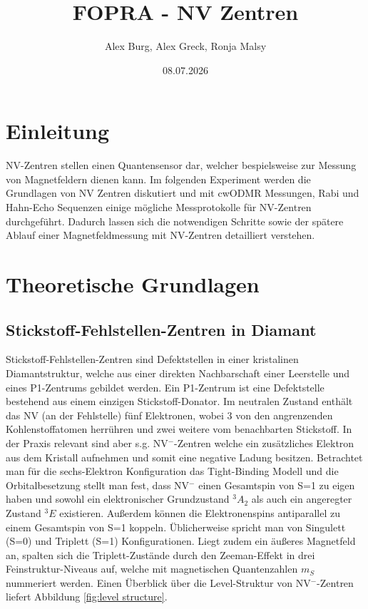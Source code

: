 \documentclass[12pt, a4paper]{article}
\title{FOPRA - NV Zentren}
\author{Alex Burg, Alex Greck, Ronja Malsy}
\date{08.07.2026}
\begin{document}
\maketitle
\tableofcontents

\newpage

\section{Einleitung}
NV-Zentren stellen einen Quantensensor dar, welcher bespielsweise zur Messung von Magnetfeldern dienen kann. Im folgenden Experiment werden die Grundlagen von NV Zentren diskutiert und mit cwODMR Messungen, Rabi und Hahn-Echo Sequenzen einige mögliche Messprotokolle für NV-Zentren durchgeführt. Dadurch lassen sich die notwendigen Schritte sowie der spätere Ablauf einer Magnetfeldmessung mit NV-Zentren detailliert verstehen.

\section{Theoretische Grundlagen}
\subsection{Stickstoff-Fehlstellen-Zentren in Diamant}
Stickstoff-Fehlstellen-Zentren sind Defektstellen in einer kristalinen Diamantstruktur, welche aus einer direkten Nachbarschaft einer Leerstelle und eines P1-Zentrums gebildet werden. Ein P1-Zentrum ist eine Defektstelle bestehend aus einem einzigen Stickstoff-Donator. Im neutralen Zustand enthält das NV (an der Fehlstelle) fünf Elektronen, wobei 3 von den angrenzenden Kohlenstoffatomen herrühren und zwei weitere vom benachbarten Stickstoff. In der Praxis relevant sind aber s.g. NV$^-$-Zentren welche ein zusätzliches Elektron aus dem Kristall aufnehmen und somit eine negative Ladung besitzen. Betrachtet man für die sechs-Elektron Konfiguration das Tight-Binding Modell und die Orbitalbesetzung stellt man fest, dass NV$^-$
einen Gesamtspin von S=1 zu eigen haben und sowohl ein elektronischer Grundzustand $^3A_2$ als auch ein angeregter Zustand $^3E$ existieren. Außerdem können die Elektronenspins antiparallel zu einem Gesamtspin von S=1 koppeln. Üblicherweise spricht man von Singulett (S=0) und Triplett (S=1) Konfigurationen. Liegt zudem ein äußeres Magnetfeld an, spalten sich die Triplett-Zustände durch den Zeeman-Effekt in drei Feinstruktur-Niveaus auf, welche mit magnetischen Quantenzahlen $m_S$ nummeriert werden. Einen Überblick über die Level-Struktur von NV$^-$-Zentren liefert Abbildung \ref{fig:level structure}.
\end{document}
